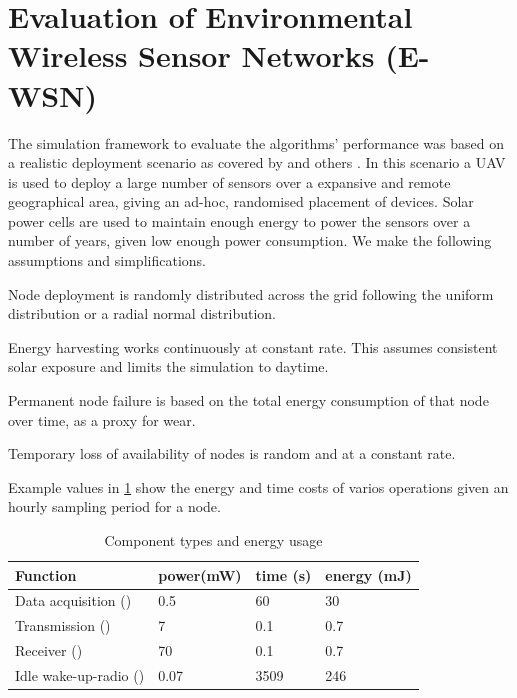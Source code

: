 \section{Evaluation of Environmental Wireless Sensor Networks (E-WSN)}
\label{section:experimental}	

The simulation framework to evaluate the algorithms' performance was based on a realistic deployment scenario as covered by  \cite{Gomez2015} and others \cite{Jha2016, Avram}. In this scenario a UAV is used to deploy a large number of sensors over a expansive and remote geographical area, giving an ad-hoc, randomised placement of devices. Solar power cells are used to maintain enough energy to power the sensors over a number of years, given low enough power consumption. We make the following assumptions and simplifications.
\begin{itemize}{
		\item Node deployment is randomly distributed across the grid following the uniform distribution or a radial normal distribution.
		\item Energy harvesting works continuously at constant rate. This assumes consistent solar exposure and limits the simulation to daytime.
		\item Permanent node failure is based on the total energy consumption of that node over time, as a proxy for wear.
		\item Temporary loss of availability of nodes is random and at a constant rate.
	}
\end{itemize}
Example values in \ref{table:components_energy_usage} show the energy and time costs of varios operations given an hourly sampling period for a node.
\begin{table}[ht]
	\begin{tabular}{p{}p{} p{} p{}}
		\hline
		\textbf{Function} & \textbf{power(mW)} & \textbf{time (s)} & \textbf{energy (mJ)}\\
		\hline
		Data acquisition (\symbolDataAcquisition{}{}) & 0.5 & 60 & 30 \\
		Transmission (\symbolTransmission{}{}) & 7 & 0.1 & 0.7 \\
		Receiver (\symbolReceiver{}{}) & 70 & 0.1 & 0.7 \\
		Idle wake-up-radio (\symbolWakeUpRadio{}{}) & 0.07 & 3509 & 246  \\
		\hline
	\end{tabular}
	\caption{Component types and energy usage}
	\label{table:components_energy_usage}
\end{table}

